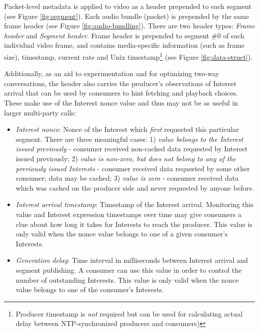 \documentclass{icn/sig-alternate-2012} %
\begin{document}
Packet-level metadata is applied to video as a header prepended to each segment (see Figure \ref{fig:segment}). Each audio bundle (packet) is prepended by the same frame header (see Figure \ref{fig:audio-bundling}). There are two header types: \textit{Frame header} and \textit{Segment header}. Frame header is prepended to segment \#0 of each individual video frame, and contains media-specific information (such as frame size), timestamp, current rate and Unix timestamp\footnote{Producer timestamp is \textit{not} required but can be used for calculating actual delay between NTP-synchronized producers and consumers)} (see Figure \ref{fig:data-struct}).

Additionally, as an aid to experimentation and for optimizing two-way conversations, the header also carries the producer's observations of Interest arrival that can be used by consumers to hint fetching and playback choices.  These make use of the Interest nonce value and thus may not be as useful in larger multi-party calls: 
\begin{itemize} [label={}]
\item \textit{Interest nonce}: Nonce of the Interest which \textit{first} requested this particular segment. There are three meaningful cases:  1) \textit{value belongs to the Interest issued previously} - consumer received non-cached data requested by Interest issued previously; 2) \textit{value is non-zero, but does not belong to any of the previously issued Interests} - consumer received data requested by some other consumer; data may be cached; 3) \textit{value is zero} - consumer received data which was cached on the producer side and never requested by anyone before.
\item \textit{Interest arrival timestamp}: Timestamp of the Interest arrival. Monitoring this value and Interest expression timestamps over time may give consumers a clue about how long it takes for Interests to reach the producer. This value is only valid when the nonce value belongs to one of a given consumer's Interests.
\item \textit{Generation delay}: Time interval in milliseconds between Interest arrival and segment publishing. A consumer can use this value in order to control the number of outstanding Interests. This value is only valid when the nonce value belongs to one of the consumer's Interests.
\end{itemize}
\end{document}
